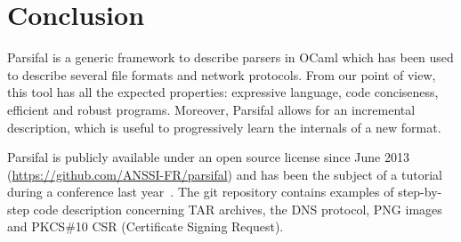 \documentclass[conference]{IEEEtran}
\begin{document}
\section{Conclusion}

Parsifal is a generic framework to describe parsers in OCaml which has
been used to describe several file formats and network protocols. From
our point of view, this tool has all the expected properties:
expressive language, code conciseness, efficient and robust
programs. Moreover, Parsifal allows for an incremental description,
which is useful to progressively learn the internals of a new
format.

Parsifal is publicly available under an open source license since June
2013 (\url{https://github.com/ANSSI-FR/parsifal}) and has been the
subject of a tutorial during a conference last
year~\cite{crisis2013}. The git repository contains examples of
step-by-step code description concerning TAR archives, the DNS
protocol, PNG images and PKCS\#10 CSR (Certificate Signing Request).




\end{document}
